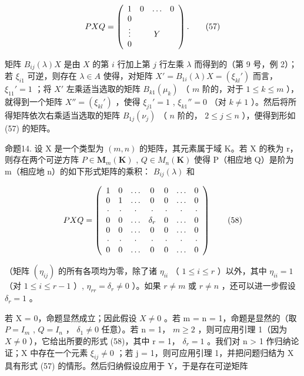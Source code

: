 \[
P X Q = \left( \begin{array}{c c c c} 1 & 0 & \ldots & 0 \\ 0 & & \\ \vdots & & Y \\ 0 & & \end{array} \right).\tag{57}
\]

矩阵 \(B_{ij}(\lambda)X\) 是由 \(X\) 的第 \(i\) 行加上第 \(j\) 行左乘 \(\lambda\) 而得到的（第 9 号，例 2）；若 \(\xi_{i1}\) 可逆，则存在 \(\lambda \in A\) 使得，对矩阵 \(X' = B_{1i}(\lambda)X = (\xi_{kl}')\) 而言， \(\xi_{11}' = 1\) ；将 \(X'\) 左乘适当选取的矩阵 \(B_{k1}(\mu_k)\) （ \(m\) 阶的，对于 \(1 \leqslant k \leqslant m\) ），就得到一个矩阵 \(X'' = (\xi_{kl}')\) ，使得 \(\xi_{j1}' = 1\) , \(\xi_{k1}'' = 0\) （对 \(k \neq 1\) ）。然后将所得矩阵依次右乘适当选取的矩阵 \(B_{1j}(\nu_j)\) （ \(n\) 阶的， \(2 \leqslant j \leqslant n\) ），便得到形如 (57) 的矩阵。

命题14. 设 X 是一个类型为 \((m, n)\) 的矩阵，其元素属于域 K。若 X 的秩为 r，则存在两个可逆方阵 \(P \in \mathbf{M}_{m}(\mathbf{K})\) , \(Q \in M_{n}(\mathbf{K})\) 使得 P（相应地 Q）是阶为 m（相应地 n）的如下形式矩阵的乘积： \(B_{ij}(\lambda)\) 和

\[
P X Q = \left( \begin{array}{c c c c c c c} 1 & 0 & \dots & 0 & 0 & \dots & 0 \\ 0 & 1 & \dots & 0 & 0 & \dots & 0 \\ \cdot & \cdot & \cdot & \cdot & \cdot & \cdot & \cdot \\ 0 & 0 & \dots & \delta_ {r} & 0 & \dots & 0 \\ 0 & 0 & \dots & 0 & 0 & \dots & 0 \\ \cdot & \cdot & \cdot & \cdot & \cdot & \cdot & \cdot \\ 0 & 0 & \dots & 0 & 0 & \dots & 0 \end{array} \right)\tag{58}
\]

（矩阵 \((\eta_{ij})\) 的所有各项均为零，除了诸 \(\eta_{ii}\) （ \(1 \leqslant i \leqslant r\) ）以外，其中 \(\eta_{ii} = 1\) （对 \(1 \leqslant i \leqslant r - 1\) ）, \(\eta_{rr} = \delta_r \neq 0\) ）。如果 \(r \neq m\) 或 \(r \neq n\) ，还可以进一步假设 \(\delta_r = 1\) 。

若 X = 0，命题显然成立；因此假设 \(X \neq 0\) 。若 m = n = 1，命题是显然的（取 \(P = I_{m}\) , \(Q = I_{n}\) ， \(\delta_{1} \neq 0\) 任意）。若 n = 1， \(m \geqslant 2\) ，则可应用引理 1（因为 \(X \neq 0\) ），它给出所要的形式 (58)，其中 r = 1， \(\delta_{r} = 1\) 。我们对 n \textgreater{} 1 作归纳论证；X 中存在一个元素 \(\xi_{ij} \neq 0\) ；若 j = 1，则可应用引理 1，并把问题归结为 X 具有形式 (57) 的情形。然后归纳假设应用于 Y，于是存在可逆矩阵

